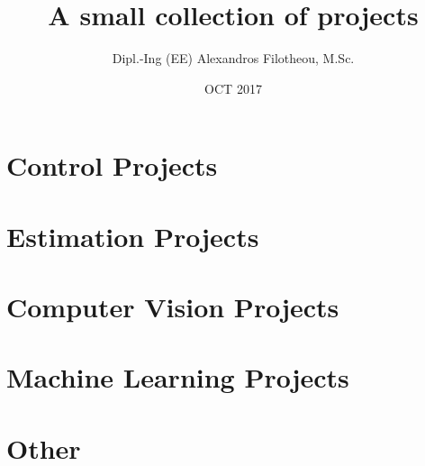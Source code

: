 \documentclass[11pt]{article}
\begin{document}
  \title{A small collection of projects}
  \author{Dipl.-Ing (EE) Alexandros Filotheou, M.Sc.}
  \date{OCT 2017}
  \maketitle
  \vspace{5cm}

  \tableofcontents
  \thispagestyle{empty}
  \clearpage

  \section{Control Projects}
    
    
    
    
    \newpage

  \section{Estimation Projects}
    
    \newpage

  \section{Computer Vision Projects}
    
    \newpage

  \section{Machine Learning Projects}
    

  \section{Other}
    
\end{document}
